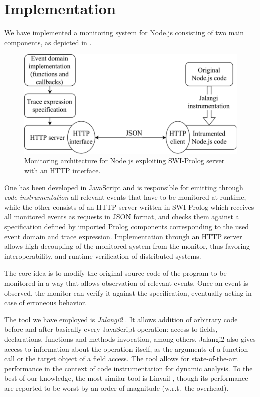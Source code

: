 \section{Implementation}
\label{sec:impl}
We have implemented a monitoring system for Node.js consisting of two main components, as depicted in .

\begin{figure}
\centering\includegraphics[width=.7\textwidth]{fig/diagram}
\caption{Monitoring architecture for Node.js exploiting SWI-Prolog server with an HTTP interface.}
\label{fig:arch}
\end{figure}

One has been developed in JavaScript and is responsible for emitting through \emph{code instrumentation} all relevant events that have to be monitored
at runtime, while the other consists of an HTTP server written in SWI-Prolog which receives all monitored events as requests in
JSON format, and checks them against a specification defined by imported Prolog components corresponding to the used event domain and trace
expression. Implementation through an HTTP server allows high decoupling of the monitored system from the monitor, thus
favoring interoperability, and runtime verification of distributed systems.


The core idea is to modify the original source code of the program to be monitored in a way that allows observation of relevant events.
Once an event is observed, the monitor can verify it against the specification, eventually acting in case of erroneous behavior.

The tool we have employed is \emph{Jalangi2} \cite{jalangi}.
It allows addition of arbitrary code before and after basically every JavaScript operation: access to fields, declarations, functions and methods invocation, among others. Jalangi2 also gives access to information about the operation itself, as the arguments of a function call or the target object of a field access.
The tool allows for state-of-the-art performance in the context of code instrumentation for dynamic analysis.
To the best of our knowledge, the most similar tool is Linvail \cite{linvail}, though its performance are reported to be worst by an order of magnitude (w.r.t.\ the overhead).

